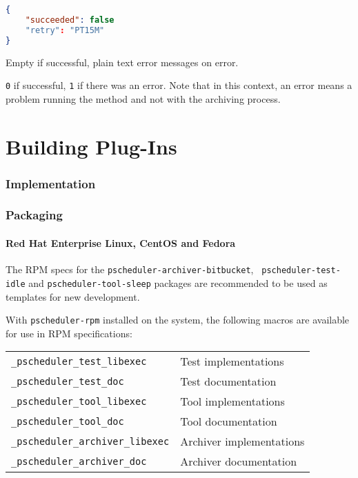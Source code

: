 \documentclass[10pt,titlepage]{article}
\begin{document}
\example
\begin{lstlisting}[language=json,firstnumber=1]
{
    "succeeded": false
    "retry": "PT15M"
}
\end{lstlisting}


 Empty if successful, plain text error
messages on error.

 {\tt 0} if successful, {\tt 1} if there was
an error.  Note that in this context, an error means a problem running
the method and not with the archiving process.





\part{Building Plug-Ins}

\section{Implementation}

\section{Packaging}

\subsection{Red Hat Enterprise Linux, CentOS and Fedora}

The RPM specs for the {\tt pscheduler-archiver-bitbucket}, {\tt
  pscheduler-test-idle} and {\tt pscheduler-tool-sleep} packages are
recommended to be used as templates for new development.

With {\tt pscheduler-rpm} installed on the system, the following
macros are available for use in RPM specifications:
\begin{center}
  \begin{tabular}{ll} 
    {\tt _pscheduler_test_libexec} & Test implementations \\
    {\tt _pscheduler_test_doc} & Test documentation \\
    {\tt _pscheduler_tool_libexec} & Tool implementations \\
    {\tt _pscheduler_tool_doc} & Tool documentation \\
    {\tt _pscheduler_archiver_libexec} & Archiver implementations \\
    {\tt _pscheduler_archiver_doc} & Archiver documentation \\
  \end{tabular}
\end{center}
\end{document}
